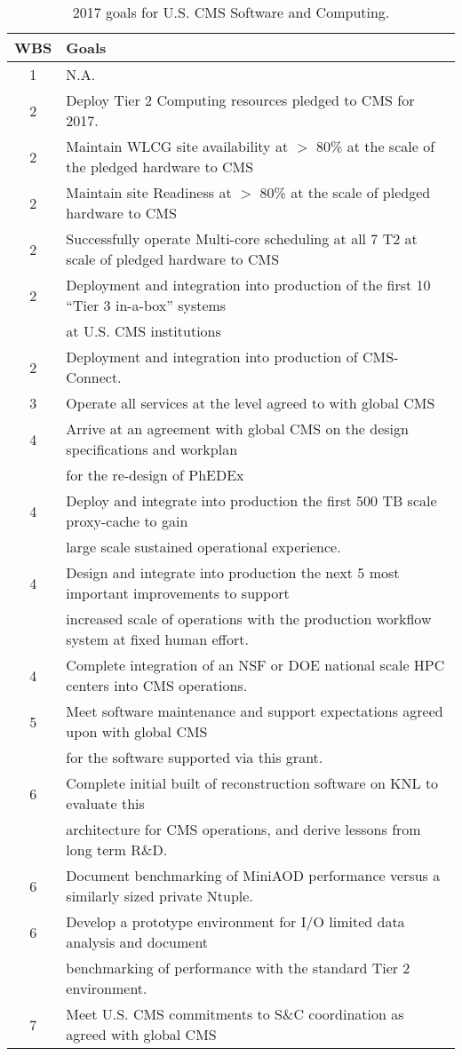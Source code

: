 \documentclass[11pt,a4paper]{article}
\begin{document}
\begin{table}
\begin{center}
\begin{tabular}{|c|l|}
\hline
WBS & Goals \\\hline
1 & N.A. \\
 2 & Deploy Tier 2 Computing resources pledged to CMS for 2017. \\
2 & Maintain WLCG site availability at $>$ 80\% at the scale of the pledged hardware to CMS\\
2 & Maintain site Readiness at $>$ 80\% at the scale of pledged hardware to CMS\\
2 & Successfully operate Multi-core scheduling at all 7 T2 at scale of pledged hardware to CMS\\
2 & Deployment and integration into production of the first 10 ``Tier 3 in-a-box'' systems\\
    & at U.S. CMS institutions\\
2 & Deployment and integration into production of CMS-Connect.\\
3 & Operate all services at the level agreed to with global CMS\\
4 & Arrive at an agreement with global CMS on the design specifications and workplan \\
    & for the re-design of PhEDEx\\
4 & Deploy and integrate into production the first 500 TB scale proxy-cache to gain \\
   & large scale sustained operational experience.\\
4 & Design and integrate into production the next 5 most important improvements to support \\
    & increased scale of operations with the production workflow system at fixed human effort.\\
4 & Complete integration of an NSF or DOE national scale HPC centers into CMS operations.\\ 
5 & Meet software maintenance and support expectations agreed upon with global CMS \\
    & for the software supported via this grant.\\
6 & Complete initial built of reconstruction software on KNL to evaluate this \\ 
    & architecture for CMS operations, and derive lessons from long term R\&D.\\
6 & Document benchmarking of MiniAOD performance versus a similarly sized private Ntuple.\\
6 & Develop a prototype environment for I/O limited data analysis and document \\
    & benchmarking of performance with the standard Tier 2 environment.\\
7 & Meet U.S. CMS commitments to S\&C coordination as agreed with global CMS\\\hline
\end{tabular}
\caption[]
{
2017 goals for U.S. CMS Software and Computing.
}
\label{scgoals}
\end{center}
\end{table}
\end{document}
